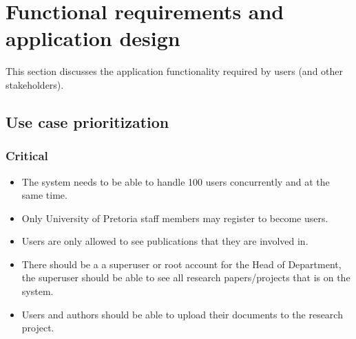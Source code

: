 \documentclass[a4paper,12pt]{report}
\begin{document}
\newpage
\section{Functional requirements and application design}
This section discusses the application functionality required by users (and other stakeholders).
\subsection{Use case prioritization}
\subsubsection{Critical}
	\begin{itemize}
		\item The system needs to be able to handle 100 users concurrently and at the same time.
		\item Only University of Pretoria staff members may register to become users.
		\item Users are only allowed to see publications that they are involved in.
		\item There should be a a superuser or root account for the Head of Department, the superuser should be able to see all research papers/projects that is on the system.
		\item Users and authors should be able to upload their documents to the research project.
	\end{itemize}
\end{document}

